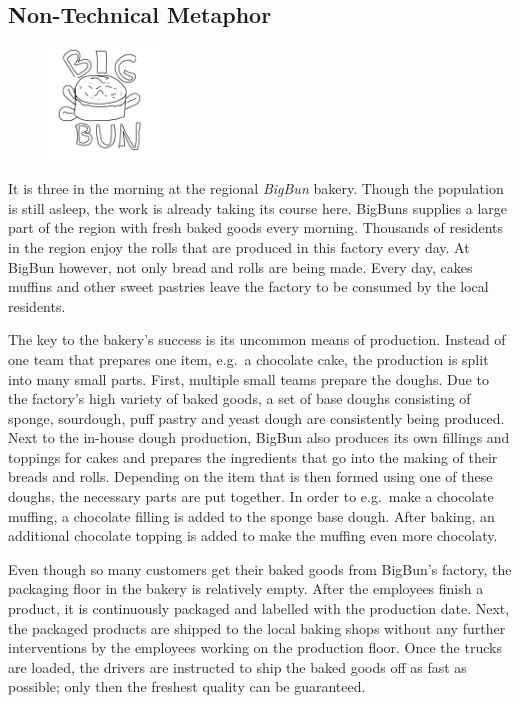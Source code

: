 
\subsection{Non-Technical Metaphor}%
\begin{figure}
\centering
\includegraphics[width=3cm]{images/figures/big_bun_logo.png}
\end{figure}
It is three in the morning at the regional \textit{BigBun} bakery. Though the
population is still asleep, the work is already taking its course here.
BigBuns supplies a large part of the region with fresh baked goods every
morning. Thousands of residents in the region enjoy the rolls that are
produced in this factory every day. At BigBun however, not only bread and rolls
are being made. Every day, cakes muffins and other sweet pastries leave the
factory to be consumed by the local residents.

The key to the bakery's success is its uncommon means of production. Instead of
one team that prepares one item, e.g.\ a chocolate cake, the production is
split into many small parts. First, multiple small teams prepare the doughs.
Due to the factory's high variety of baked goods, a set of base doughs
consisting of sponge, sourdough, puff pastry and yeast dough are consistently
being produced. Next to the in-house dough production, BigBun also produces its
own fillings and toppings for cakes and prepares the ingredients that go into
the making of their breads and rolls. Depending on the item that is then formed
using one of these doughs, the necessary parts are put together. In order to
e.g.\ make a chocolate muffing, a chocolate filling is added to the sponge base
dough. After baking, an additional chocolate topping is added to make the
muffing even more chocolaty.

Even though so many customers get their baked goods from BigBun's factory, the
packaging floor in the bakery is relatively empty. After the employees finish a
product, it is continuously packaged and labelled with the production date.
Next, the packaged products are shipped to the local baking shops without any
further interventions by the employees working on the production floor. Once
the trucks are loaded, the drivers are instructed to ship the baked goods off
as fast as possible; only then the freshest quality can be guaranteed.

